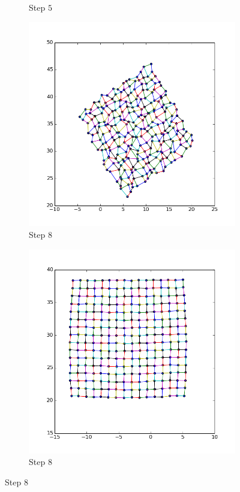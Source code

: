 \documentclass[12pt,a4paper]{article}
\begin{document}
\begin{figure} [htb]
\begin{minipage}[0.2\textheight]{\textwidth}
\begin{subfigure}{0.5\textwidth}
            \caption{Step $5$}
     \end{subfigure}        
\end{minipage}
\begin{minipage}[0.2\textheight]{\textwidth}	%
	 \begin{subfigure}{0.5\textwidth}
		   \centering
           \includegraphics[scale=0.3]{results_Harel/rand1/HK_step8_eps1.png}
           \caption{Step $8$}
     \end{subfigure}
	 \begin{subfigure}{0.5\textwidth}
	 	    \centering
            \includegraphics[scale=0.3]{results_Harel/rand01/HK_step8_eps01.png}
            \caption{Step $8$}
     \end{subfigure}        
\end{minipage}


\end{figure}
\end{document}
